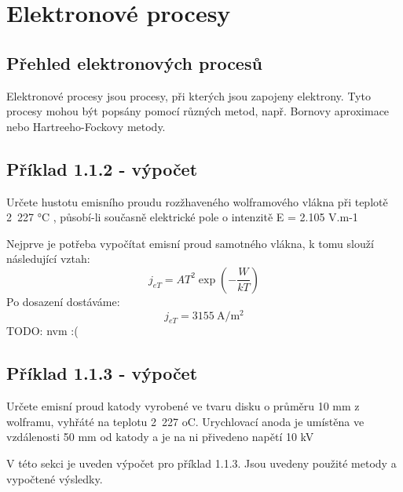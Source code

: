 \section{Elektronové procesy}

\subsection{Přehled elektronových procesů}

Elektronové procesy jsou procesy, při kterých jsou zapojeny elektrony. Tyto procesy mohou být popsány pomocí různých metod, např. Bornovy aproximace nebo Hartreeho-Fockovy metody.

\subsection{Příklad 1.1.2 - výpočet}
\begin{zadani}
    Určete hustotu emisního proudu rozžhaveného wolframového vlákna 
    při teplotě 2 227 °C , působí-li současně elektrické pole o intenzitě 
    E = 2.105 V.m-1
\end{zadani}

Nejprve je potřeba vypočítat emisní proud samotného vlákna, k tomu slouží následující vztah:
\[
    j_{eT} = A T^2 \exp\left(-\frac{W}{kT}\right)
\]
Po dosazení dostáváme:
\[
    j_{eT} =\qty{3155}{\ampere\per\square\meter}
\]
TODO: nvm :(




\subsection{Příklad 1.1.3 - výpočet}
\begin{zadani}
    Určete emisní proud katody vyrobené ve tvaru disku o průměru 10 mm
    z wolframu, vyhřáté na teplotu 2 227 oC. Urychlovací anoda je umístěna 
    ve vzdálenosti  50 mm  od katody a je na ni přivedeno napětí  10 kV
\end{zadani}

V této sekci je uveden výpočet pro příklad 1.1.3. Jsou uvedeny použité metody a vypočtené výsledky.